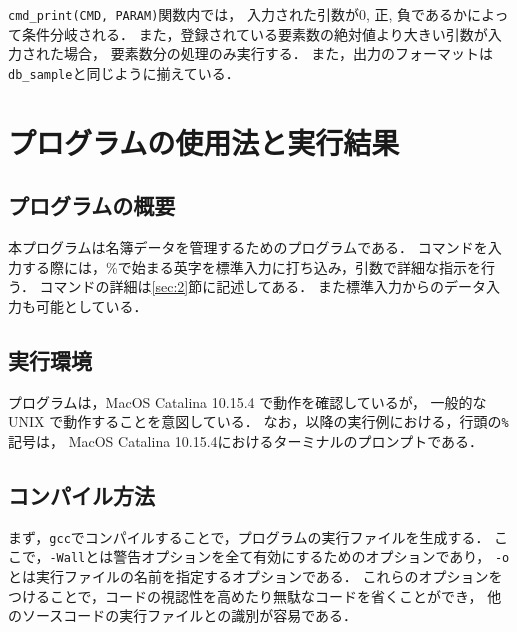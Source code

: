 \documentclass[autodetect-engine,dvi=dvipdfmx,ja=standard,
               a4j,11pt]{bxjsarticle}
\begin{document}
\verb|cmd_print(CMD, PARAM)|関数内では，
入力された引数が0, 正, 負であるかによって条件分岐される．
また，登録されている要素数の絶対値より大きい引数が入力された場合，
要素数分の処理のみ実行する．
また，出力のフォーマットは\verb|db_sample|と同じように揃えている．


\section{プログラムの使用法と実行結果} \label{sec:4}

\subsection{プログラムの概要}

本プログラムは名簿データを管理するためのプログラムである．
コマンドを入力する際には，\%で始まる英字を標準入力に打ち込み，引数で詳細な指示を行う．
コマンドの詳細は\ref{sec:2}節に記述してある．
また標準入力からのデータ入力も可能としている．

\subsection{実行環境}

プログラムは，MacOS Catalina 10.15.4 で動作を確認しているが，
一般的な UNIX で動作することを意図している．
なお，以降の実行例における，行頭の\verb|%|記号は，
MacOS Catalina 10.15.4におけるターミナルのプロンプトである．

\subsection{コンパイル方法}

まず，\verb|gcc|でコンパイルすることで，プログラムの実行ファイルを生成する．
ここで，\verb|-Wall|とは警告オプションを全て有効にするためのオプションであり，
\verb|-o|とは実行ファイルの名前を指定するオプションである．
これらのオプションをつけることで，コードの視認性を高めたり無駄なコードを省くことができ，
他のソースコードの実行ファイルとの識別が容易である．
\end{document}
